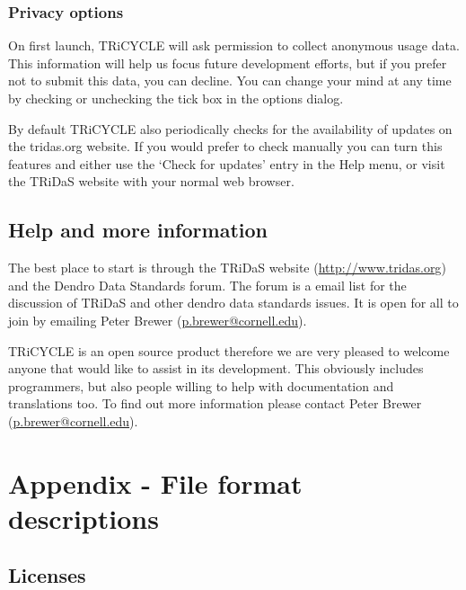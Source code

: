 \documentclass[10pt, headsepline,DIV14,BCOR0.5cm]{scrreprt}
\begin{document}
\section{Privacy options}

On first launch, TRiCYCLE will ask permission to collect anonymous usage data.  This information will help us focus future development efforts, but if you prefer not to submit this data, you can decline.  You can change your mind at any time by checking or unchecking the tick box in the options dialog.

By default TRiCYCLE also periodically checks for the availability of updates on the tridas.org website.  If you would prefer to check manually you can turn this features and either use the `Check for updates' entry in the Help menu, or visit the TRiDaS website with your normal web browser.

\chapter{Help and more information}

The best place to start is through the TRiDaS website (\url{http://www.tridas.org}) and the
Dendro Data Standards forum. The forum is a email list for the discussion of TRiDaS and other dendro
data standards issues. It is open for all to join by emailing Peter Brewer (\href{mailto:p.brewer@cornell.edu}{p.brewer@cornell.edu}).

TRiCYCLE is an open source product therefore we are very pleased to welcome anyone that would
like to assist in its development. This obviously includes programmers, but also people willing to help
with documentation and translations too. To find out more information please contact Peter Brewer
(\href{mailto:p.brewer@cornell.edu}{p.brewer@cornell.edu}).






\part*{Appendix - File format descriptions}

\appendix



\chapter{Licenses}
\end{document}
